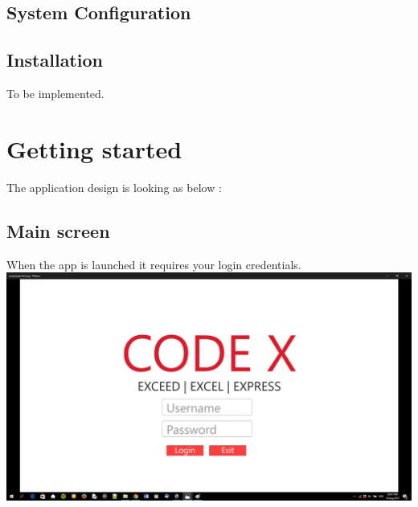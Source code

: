 \documentclass[a4paper,10pt]{article}
\begin{document}
\subsection{System Configuration}

\subsection{Installation}
To be implemented.

\section{Getting started}
	The application design is looking as below : \\
	\subsection{Main screen}
	When the app is launched it requires your login credentials.\\
	{\centering\includegraphics[width=15cm, scale=0.5]{smarctsearch1.jpg}}
\end{document}
